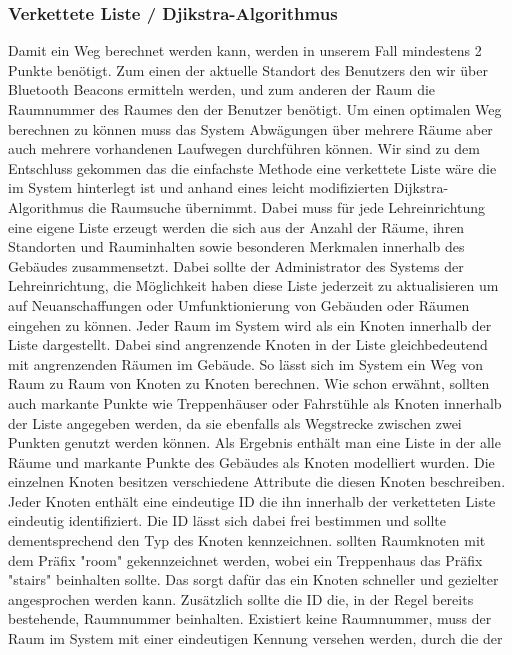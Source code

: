 \subsubsection{Verkettete Liste / Djikstra-Algorithmus}
\label{sec:Verkettete_Liste_Djikstra-Algorithmus}

Damit ein Weg berechnet werden kann, werden in unserem Fall mindestens 2 Punkte
benötigt. Zum einen der aktuelle Standort des Benutzers den wir über Bluetooth
Beacons ermitteln werden, und zum anderen der Raum \bspw die Raumnummer des
Raumes den der Benutzer benötigt. Um einen optimalen Weg berechnen zu können
muss das System Abwägungen über mehrere Räume aber auch mehrere vorhandenen
Laufwegen durchführen können.
Wir sind zu dem Entschluss gekommen das die einfachste Methode eine verkettete
Liste wäre die im System hinterlegt ist und anhand eines leicht modifizierten
Dijkstra-Algorithmus die Raumsuche übernimmt. Dabei muss für jede
Lehreinrichtung eine eigene Liste erzeugt werden die sich aus der Anzahl der
Räume, ihren Standorten und Rauminhalten sowie besonderen Merkmalen innerhalb
des Gebäudes zusammensetzt. Dabei sollte \zB der Administrator des Systems der
Lehreinrichtung, die Möglichkeit haben diese Liste jederzeit zu aktualisieren
um auf \zB Neuanschaffungen oder Umfunktionierung von Gebäuden oder Räumen
eingehen zu können.
Jeder Raum im System wird als ein Knoten innerhalb der Liste dargestellt.
Dabei sind angrenzende Knoten in der Liste gleichbedeutend mit angrenzenden
Räumen im Gebäude. So lässt sich im System ein Weg von Raum zu Raum \bzw von
Knoten zu Knoten berechnen. Wie schon erwähnt, sollten auch markante Punkte wie
Treppenhäuser oder Fahrstühle als Knoten innerhalb der Liste angegeben werden,
da sie ebenfalls als Wegstrecke zwischen zwei Punkten genutzt werden können.
Als Ergebnis enthält man eine Liste in der alle Räume und markante Punkte des
Gebäudes als Knoten modelliert wurden. Die einzelnen Knoten besitzen
verschiedene Attribute die diesen Knoten beschreiben. Jeder Knoten enthält
eine eindeutige ID die ihn innerhalb der verketteten Liste eindeutig
identifiziert. Die ID lässt sich dabei frei bestimmen und sollte
dementsprechend den Typ des Knoten kennzeichnen. \Bspw sollten Raumknoten mit
dem Präfix "room" gekennzeichnet werden, wobei ein Treppenhaus das Präfix
"stairs" beinhalten sollte. Das sorgt dafür das ein Knoten schneller und
gezielter angesprochen werden kann. Zusätzlich sollte die ID die, in der Regel
bereits bestehende, Raumnummer beinhalten. Existiert keine Raumnummer, muss der
Raum im System mit einer eindeutigen Kennung versehen werden, durch die der
